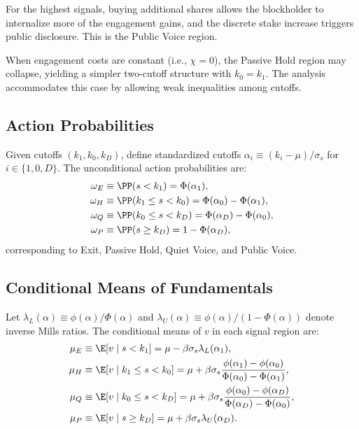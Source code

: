 For the highest signals, buying additional shares allows the blockholder to internalize more of the engagement gains, and the discrete stake increase triggers public disclosure. This is the Public Voice region.

When engagement costs are constant (i.e., $\chi=0$), the Passive Hold region may collapse, yielding a simpler two-cutoff structure with $k_0=k_1$. The analysis accommodates this case by allowing weak inequalities among cutoffs.

\subsection{Action Probabilities}

Given cutoffs $(k_1, k_0, k_D)$, define standardized cutoffs $\alpha_i \equiv (k_i - \mu)/\sigma_s$ for $i \in \{1, 0, D\}$. The unconditional action probabilities are:
\begin{align*}
\omega_E &\equiv \PP(s < k_1) = \Phi(\alpha_1), \\
\omega_H &\equiv \PP(k_1 \leq s < k_0) = \Phi(\alpha_0) - \Phi(\alpha_1), \\
\omega_Q &\equiv \PP(k_0 \leq s < k_D) = \Phi(\alpha_D) - \Phi(\alpha_0), \\
\omega_P &\equiv \PP(s \geq k_D) = 1 - \Phi(\alpha_D),
\end{align*}
corresponding to Exit, Passive Hold, Quiet Voice, and Public Voice.

\subsection{Conditional Means of Fundamentals}

Let $\lambda_L(\alpha) \equiv \phi(\alpha)/\Phi(\alpha)$ and $\lambda_U(\alpha) \equiv \phi(\alpha)/(1-\Phi(\alpha))$ denote inverse Mills ratios. The conditional means of $v$ in each signal region are:
\begin{align*}
\mu_E &\equiv \E[v \mid s < k_1] = \mu - \beta\sigma_s \lambda_L(\alpha_1), \\
\mu_H &\equiv \E[v \mid k_1 \leq s < k_0] = \mu + \beta\sigma_s \frac{\phi(\alpha_1) - \phi(\alpha_0)}{\Phi(\alpha_0) - \Phi(\alpha_1)}, \\
\mu_Q &\equiv \E[v \mid k_0 \leq s < k_D] = \mu + \beta\sigma_s \frac{\phi(\alpha_0) - \phi(\alpha_D)}{\Phi(\alpha_D) - \Phi(\alpha_0)}, \\
\mu_P &\equiv \E[v \mid s \geq k_D] = \mu + \beta\sigma_s \lambda_U(\alpha_D).
\end{align*}

